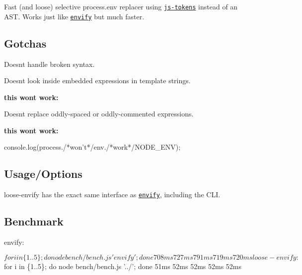 \href{https://travis-ci.org/zertosh/loose-envify}{\tt }

Fast (and loose) selective {\ttfamily process.\+env} replacer using \href{https://github.com/lydell/js-tokens}{\tt js-\/tokens} instead of an A\+ST. Works just like \href{https://github.com/hughsk/envify}{\tt envify} but much faster.

\subsection*{Gotchas}


\begin{DoxyItemize}
\item Doesn\textquotesingle{}t handle broken syntax.
\item Doesn\textquotesingle{}t look inside embedded expressions in template strings.
\begin{DoxyItemize}
\item {\bfseries this won\textquotesingle{}t work\+:} 

\end{DoxyItemize}
\item Doesn\textquotesingle{}t replace oddly-\/spaced or oddly-\/commented expressions.
\begin{DoxyItemize}
\item {\bfseries this won\textquotesingle{}t work\+:} 
\begin{DoxyCode}
console.log(process./*won't*/env./*work*/NODE\_ENV);
\end{DoxyCode}

\end{DoxyItemize}
\end{DoxyItemize}

\subsection*{Usage/\+Options}

loose-\/envify has the exact same interface as \href{https://github.com/hughsk/envify}{\tt envify}, including the C\+LI.

\subsection*{Benchmark}


\begin{DoxyCode}
envify:

  $ for i in \{1..5\}; do node bench/bench.js 'envify'; done
  708ms
  727ms
  791ms
  719ms
  720ms

loose-envify:

  $ for i in \{1..5\}; do node bench/bench.js '../'; done
  51ms
  52ms
  52ms
  52ms
  52ms
\end{DoxyCode}
 